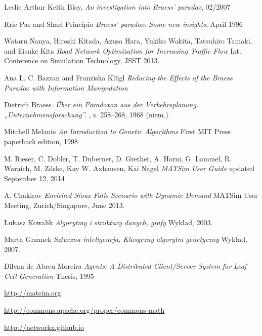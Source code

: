 \documentclass[twoside,12pt]{report}
\renewcommand{\bibname}{Bibliografia}
\begin{document}
\cleardoublepage
{}
\addcontentsline{toc}{chapter}{\bibname} 
\begin{thebibliography}{99}
	Leslie Arthur Keith Bloy, 
	\newblock \textit{An investigation into Braess’ paradox}, 02/2007

	Rric Pas and Shari Principio
	\newblock \textit{Braess’ paradox: Some new insights}, April 1996

	Wataru Nanya, Hiroshi Kitada, Azusa Hara, Yukiko Wakita, Tatsuhiro Tamaki, and Eisuke Kita
	\newblock \textit{Road Network Optimization for Increasing Traffic Flow}
	\newblock Int. Conference on Simulation Technology, JSST 2013.

	Ana L. C. Bazzan and Franziska Klügl
	\newblock \textit{Reducing the Effects of the Braess Paradox with Information Manipulation}

	Dietrich Braess. 
	\newblock \textit{Über ein Paradoxon aus der Verkehrsplanung. „Unternehmensforschung”.} 
	, s. 258–268, 1968 (niem.).

	Mitchell Melanie
	\newblock \textit{An Introduction to Genetic Algorithms}
	\newblock First MIT Press paperback edition, 1998

	M. Rieser, C. Dobler, T. Dubernet, D. Grether, A. Horni, G. Lammel, R. Waraich, M. Zilske, Kay W. Axhausen, Kai Nagel
	\newblock \textit{MATSim User Guide}
	\newblock updated September 12, 2014

	A. Chakirov
	\newblock \textit{Enriched Sioux Falls Scenario with Dynamic Demand}
	\newblock MATSim User Meeting, Zurich/Singapore, June 2013.
	
	Łukasz Kowalik
	\newblock \textit{Algorytmy i struktury danych, grafy}
	\newblock Wykład, 2003.
	
	Marta Grzanek
	\newblock \textit{Sztuczna inteligencja, Klasyczny algorytm genetyczny}
	\newblock Wykład, 2007.
	
	Dilvan de Abreu Moreira
	\newblock \textit{Agents: A Distributed Client/Server System for Leaf Cell Generation}
	\newblock Thesis, 1995
	
	\url{http://matsim.org}	

	\url{http://commons.apache.org/proper/commons-math}
	
	\url{http://networkx.github.io}


\end{thebibliography}
\end{document}
